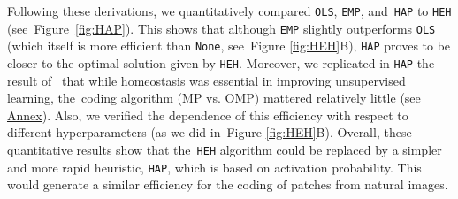 \documentclass[vision,article,accept,oneauthor,pdftex]{Definitions/mdpi}
\newcommand{\seeFig}[1]{Figure~\ref{fig:#1}}%
\begin{document}
Following these derivations, we quantitatively compared \texttt{OLS}, \texttt{EMP}, and~\texttt{HAP} to \texttt{HEH} (see~\seeFig{HAP}). This shows that although \texttt{EMP} slightly outperforms \texttt{OLS} (which itself is more efficient than \texttt{None}, see~Figure \ref{fig:HEH}B), \texttt{HAP} proves to be closer to the optimal solution given by \texttt{HEH}. %
Moreover, we replicated in \texttt{HAP} the result of~\cite{Sandin17} that while homeostasis was essential in improving unsupervised learning, the~coding algorithm (MP vs. OMP) mattered relatively little (see \href{https://spikeai.github.io/HULK/#Testing-different-algorithms}{Annex}). Also, we verified the dependence of this efficiency with respect to different hyperparameters (as we did in~Figure \ref{fig:HEH}B). %
Overall, these quantitative results show that the~\texttt{HEH} algorithm could be replaced by a simpler and more rapid heuristic, \texttt{HAP}, which is based on activation probability. This would generate a similar efficiency for the coding of patches from natural images.
\end{document}

